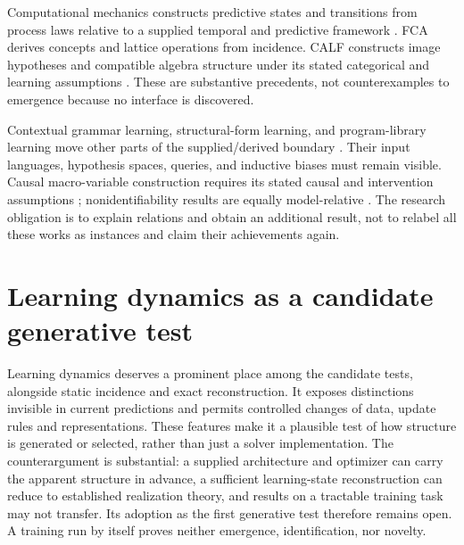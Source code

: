 \documentclass[11pt]{article}
\theoremstyle{remark}
\begin{document}
Computational mechanics constructs predictive states and transitions from process laws relative to a supplied temporal and predictive framework \cite{ComputationalMechanics}. FCA derives concepts and lattice operations from incidence. CALF constructs image hypotheses and compatible algebra structure under its stated categorical and learning assumptions \cite{FCA,CALF}. These are substantive precedents, not counterexamples to emergence because no interface is discovered.

Contextual grammar learning, structural-form learning, and program-library learning move other parts of the supplied/derived boundary \cite{ContextualGrammar,StructuralForm,DreamCoder}. Their input languages, hypothesis spaces, queries, and inductive biases must remain visible. Causal macro-variable construction requires its stated causal and intervention assumptions \cite{MacroVariables}; nonidentifiability results are equally model-relative \cite{Disentanglement}. The research obligation is to explain relations and obtain an additional result, not to relabel all these works as instances and claim their achievements again.

\section{Learning dynamics as a candidate generative test}
\label{sec:learning}

Learning dynamics deserves a prominent place among the candidate tests, alongside static incidence and exact reconstruction. It exposes distinctions invisible in current predictions and permits controlled changes of data, update rules and representations. These features make it a plausible test of how structure is generated or selected, rather than just a solver implementation. The counterargument is substantial: a supplied architecture and optimizer can carry the apparent structure in advance, a sufficient learning-state reconstruction can reduce to established realization theory, and results on a tractable training task may not transfer. Its adoption as the first generative test therefore remains open. A training run by itself proves neither emergence, identification, nor novelty.
\end{document}
